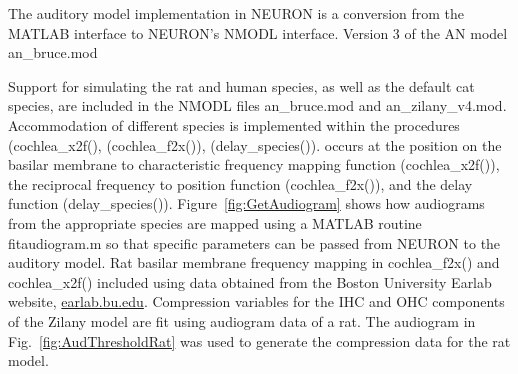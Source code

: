 The auditory model implementation in NEURON is a conversion from the MATLAB
interface to NEURON's NMODL interface. Version 3 of the AN model
\mbox{\textsf{an\_bruce.mod}}

Support for simulating the rat and human species, as well as the default cat
species, are included in the NMODL files \mbox{\textsf{an\_bruce.mod}} and
\mbox{\textsf{an\_zilany\_v4.mod}}.  Accommodation of different species is
implemented within the procedures (\mbox{\textsf{cochlea\_x2f()}},
(\mbox{\textsf{cochlea\_f2x()}}), (\mbox{\textsf{delay\_species()}}). occurs at
the position on the basilar membrane to characteristic frequency mapping
function (\mbox{\textsf{cochlea\_x2f()}}), the reciprocal frequency to position
function (\mbox{\textsf{cochlea\_f2x()}}), and the delay function
(\mbox{\textsf{delay\_species()}}).  Figure~\ref{fig:GetAudiogram} shows how
audiograms from the appropriate species are mapped using a MATLAB routine
\mbox{\textsf{fitaudiogram.m}} so that specific parameters can be passed from
NEURON to the auditory model.  Rat basilar membrane frequency mapping in
\mbox{\textsf{cochlea\_f2x()}} and \mbox{\textsf{cochlea\_x2f()}} included using
data obtained from the Boston University Earlab website, \url{earlab.bu.edu}.
Compression variables for the IHC and OHC components of the Zilany model are fit
using audiogram data of a rat.  The audiogram in Fig.~\ref{fig:AudThresholdRat}
was used to generate the compression data for the rat model.






